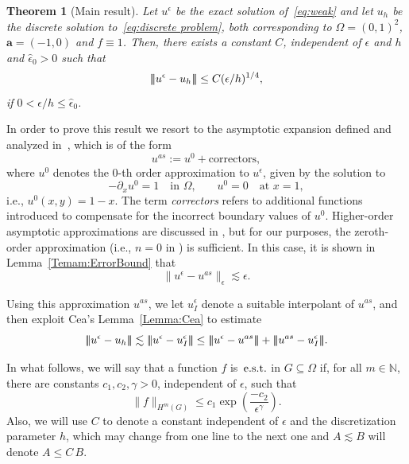 \documentclass{article}
\newcommand{\vvvert}{\ensuremath|\!|\!|\xspace}
\newcommand{\est}{\text{\,e.s.t.}\xspace}
\newtheorem{thm}{Theorem}
\newcommand{\aaa}{\ensuremath{\mathbf{a}}\xspace}
\newcommand{\nz}{\mathbb{N}}
\newcommand{\ueps}{u^\epsilon}
\newcommand{\uas}{u^{as}}
\begin{document}
\begin{thm}[Main result]\label{Thm:main}
    Let $\ueps$ be the exact solution of~\eqref{eq:weak} and let $u_h$ be the discrete solution to~\eqref{eq:discrete problem}, both corresponding to $\Omega = (0,1)^2$, $\aaa = (-1,0)$ and $f \equiv 1$.
    Then, there exists a constant $C$, independent of $\epsilon$ and $h$ and $\hat{\epsilon}_0 >0$ such that
    \[ \vvvert \ueps - u_h\vvvert \le C (\epsilon/h)^{1/4}, \]
if $0<\epsilon/h \leq \hat{\epsilon}_0$.
\end{thm}


In order to prove this result we resort to the asymptotic expansion defined and analyzed in~\cite{GieEtAl:13}, which is of the form
\begin{equation*}
\uas := u^0 + \text{correctors},
\end{equation*}
where $u^0$ denotes the $0$-th order approximation to $\ueps$, given by the solution to
\begin{equation*}
    -  \partial_x u^0 =1 \quad\text{in $\Omega$,}\qquad
        u^0 = 0 \quad\text{at } x=1,
\end{equation*}  
i.e., $u^0(x,y) = 1-x$.
The term \emph{correctors} refers to additional functions introduced to compensate for the incorrect boundary values of $u^0$. Higher-order asymptotic approximations are discussed in  \cite{GieEtAl:13} %
, but for our purposes, the zeroth-order approximation (i.e., $n = 0$ in \cite{GieEtAl:13}) is sufficient. In this case, it is shown in Lemma~\ref{Temam:ErrorBound} that
\begin{equation*}
  \| \ueps - \uas \|_\epsilon \lesssim \epsilon.
\end{equation*}

Using this approximation $\uas$, we let $\ueps_I$ denote a suitable interpolant of $\uas$, 
and then exploit Cea's Lemma~\ref{Lemma:Cea} to estimate
\begin{equation}\label{eq:Cea}
\vvvert \ueps - u_h\vvvert  \lesssim \vvvert \ueps - \ueps_I \vvvert  \le  \vvvert  \ueps - \uas\vvvert  + \vvvert  \uas - \ueps_I\vvvert .
\end{equation}

\medskip


In what follows, we will say that a function $f$ is $\est$ in $G\subseteq\Omega$ if, for all $m\in\nz$, there are constants $c_1,c_2,\gamma > 0$, independent of $\epsilon$, such that
$$
\| f\|_{H^m(G)} \leq c_1 \exp(\frac{-c_2}{\epsilon^\gamma}).
$$
Also, we will use $C$ to denote a constant independent of $\epsilon$ and the discretization parameter $h$, which may change from one line to the next one and $A \lesssim B$ will denote $A \le C\, B$.
\end{document}
